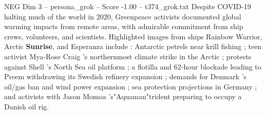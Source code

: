 \begin{textsample}{NEG Dim 3 – persona\_grok – Score -1.00 – t374\_grok.txt}  \label{ex:f3_neg_025}
Despite COVID-19 halting much of the world in 2020, Greenpeace activists documented global warming impacts from remote areas, with admirable commitment from ship crews, volunteers, and scientists.
Highlighted images from ships Rainbow Warrior, Arctic \textbf{Sunrise}, and Esperanza include : Antarctic petrels near krill fishing ; teen activist Mya-Rose Craig 's northernmost climate strike in the Arctic ; protests against Shell 's North Sea oil platform ; a flotilla and 62-hour blockade leading to Preem withdrawing its Swedish refinery expansion ; demands for Denmark 's oil/gas ban and wind power expansion ; sea protection projections in Germany ; and activists with Jason Momoa 's"Aquaman"trident preparing to occupy a Danish oil rig.

\end{textsample}
